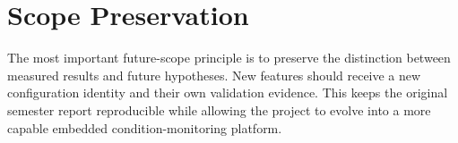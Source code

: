 \section{Scope Preservation}
\hspace{2em}The most important future-scope principle is to preserve the distinction between measured results and future hypotheses. New features should receive a new configuration identity and their own validation evidence. This keeps the original semester report reproducible while allowing the project to evolve into a more capable embedded condition-monitoring platform.
